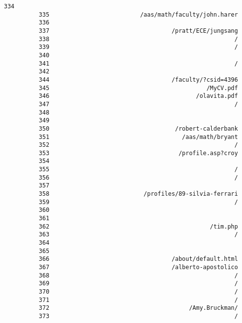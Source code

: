 \documentclass[11pt]{article}
\begin{document}
\begin{Verbatim}[commandchars=\\\{\}]
          334                                                      
          335                          /aas/math/faculty/john.harer
          336                                                      
          337                                   /pratt/ECE/jungsang
          338                                                     /
          339                                                     /
          340                                                      
          341                                                     /
          342                                                      
          344                                   /faculty/?csid=4396
          345                                             /MyCV.pdf
          346                                          /olavita.pdf
          347                                                     /
          348                                                      
          349                                                      
          350                                    /robert-calderbank
          351                                      /aas/math/bryant
          352                                                     /
          353                                     /profile.asp?croy
          354                                                      
          355                                                     /
          356                                                     /
          357                                                      
          358                           /profiles/89-silvia-ferrari
          359                                                     /
          360                                                      
          361                                                      
          362                                              /tim.php
          363                                                     /
          364                                                      
          365                                                      
          366                                   /about/default.html
          367                                   /alberto-apostolico
          368                                                     /
          369                                                     /
          370                                                     /
          371                                                     /
          372                                        /Amy.Bruckman/
          373                                                     /

\end{Verbatim}
\end{document}
